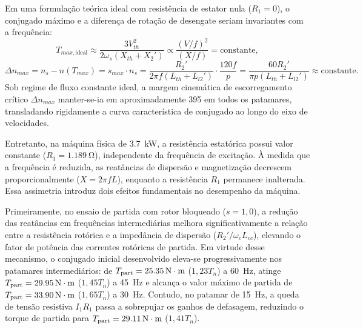 Em uma formulação teórica ideal com resistência de estator nula ($R_1 = 0$), o conjugado máximo e a diferença de rotação de desengate seriam invariantes com a frequência:
\begin{equation}
T_{max,\text{ideal}} \approx \frac{3 V_{th}^2}{2\omega_s (X_{th} + X_2')} \propto \frac{(V/f)^2}{(X/f)} = \text{constante},
\label{eq:tmax_ideal_invariante}
\end{equation}
\begin{equation}
\Delta n_{max} = n_s - n(T_{max}) = s_{max} \cdot n_s = \frac{R_2'}{2\pi f (L_{th} + L_{l2}')} \cdot \frac{120 f}{p} = \frac{60 R_2'}{\pi p (L_{th} + L_{l2}')} \approx \text{constante}.
\label{eq:delta_n_max_invariante}
\end{equation}
Sob regime de fluxo constante ideal, a margem cinemática de escorregamento crítico $\Delta n_{max}$ manter-se-ia em aproximadamente \SI{395}{\RPM} em todos os patamares, transladando rigidamente a curva característica de conjugado ao longo do eixo de velocidades.

Entretanto, na máquina física de \SI{3,7}{\kilo\watt}, a resistência estatórica possui valor constante ($R_1 = \SI{1,189}{\ohm}$), independente da frequência de excitação. À medida que a frequência é reduzida, as reatâncias de dispersão e magnetização decrescem proporcionalmente ($X = 2\pi f L$), enquanto a resistência $R_1$ permanece inalterada. Essa assimetria introduz dois efeitos fundamentais no desempenho da máquina.

Primeiramente, no ensaio de partida com rotor bloqueado ($s = 1{,}0$), a redução das reatâncias em frequências intermediárias melhora significativamente a relação entre a resistência rotórica e a impedância de dispersão ($R_2' / \omega_e L_{cc}$), elevando o fator de potência das correntes rotóricas de partida. Em virtude desse mecanismo, o conjugado inicial desenvolvido eleva-se progressivamente nos patamares intermediários: de $T_{\text{part}} = \SI{25,35}{\mathrm{N\cdot m}}$ ($1{,}23 T_n$) a \SI{60}{\hertz}, atinge $T_{\text{part}} = \SI{29,95}{\mathrm{N\cdot m}}$ ($1{,}45 T_n$) a \SI{45}{\hertz} e alcança o valor máximo de partida de $T_{\text{part}} = \SI{33,90}{\mathrm{N\cdot m}}$ ($1{,}65 T_n$) a \SI{30}{\hertz}. Contudo, no patamar de \SI{15}{\hertz}, a queda de tensão resistiva $I_1 R_1$ passa a sobrepujar os ganhos de defasagem, reduzindo o torque de partida para $T_{\text{part}} = \SI{29,11}{\mathrm{N\cdot m}}$ ($1{,}41 T_n$).

